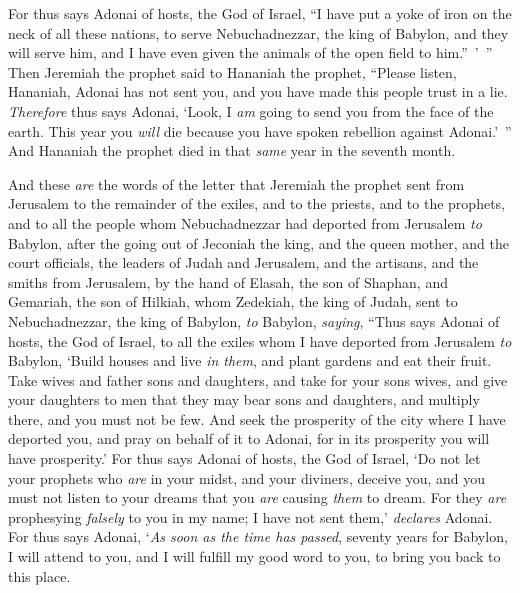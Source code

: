 \begin{biblechapter}
\verse For thus says Adonai of hosts, the God of Israel, “I have put a yoke of iron on the neck of all these nations, to serve Nebuchadnezzar, the king of Babylon, and they will serve him, and I have even given the animals of the open field to him.” ’ ”
\verse Then Jeremiah the prophet said to Hananiah the prophet, “Please listen, Hananiah, Adonai has not sent you, and you have made this people trust in a lie.
\verse \textit{Therefore} thus says Adonai, ‘Look, I \textit{am} going to send you from the face of the earth. This year you \textit{will} die because you have spoken rebellion against Adonai.’ ”
\verse And Hananiah the prophet died in that \textit{same} year in the seventh month.
\end{biblechapter}

\begin{biblechapter} %
 And these \textit{are} the words of the letter that Jeremiah the prophet sent from Jerusalem to the remainder of the exiles, and to the priests, and to the prophets, and to all the people whom Nebuchadnezzar had deported from Jerusalem \textit{to} Babylon,
\verse after the going out of Jeconiah the king, and the queen mother, and the court officials, the leaders of Judah and Jerusalem, and the artisans, and the smiths from Jerusalem,
\verse by the hand of Elasah, the son of Shaphan, and Gemariah, the son of Hilkiah, whom Zedekiah, the king of Judah, sent to Nebuchadnezzar, the king of Babylon, \textit{to} Babylon, \textit{saying},
\verse “Thus says Adonai of hosts, the God of Israel, to all the exiles whom I have deported from Jerusalem \textit{to} Babylon,
\verse ‘Build houses and live \textit{in them}, and plant gardens and eat their fruit.
\verse Take wives and father sons and daughters, and take for your sons wives, and give your daughters to men that they may bear sons and daughters, and multiply there, and you must not be few.
\verse And seek the prosperity of the city where I have deported you, and pray on behalf of it to Adonai, for in its prosperity you will have prosperity.’
\verse For thus says Adonai of hosts, the God of Israel, ‘Do not let your prophets who \textit{are} in your midst, and your diviners, deceive you, and you must not listen to your dreams that you \textit{are} causing \textit{them} to dream.
\verse For they \textit{are} prophesying \textit{falsely} to you in my name; I have not sent them,’ \textit{declares} Adonai.
\verse For thus says Adonai, ‘\textit{As soon as the time has passed}, seventy years for Babylon, I will attend to you, and I will fulfill my good word to you, to bring you back to this place.

\end{biblechapter}
